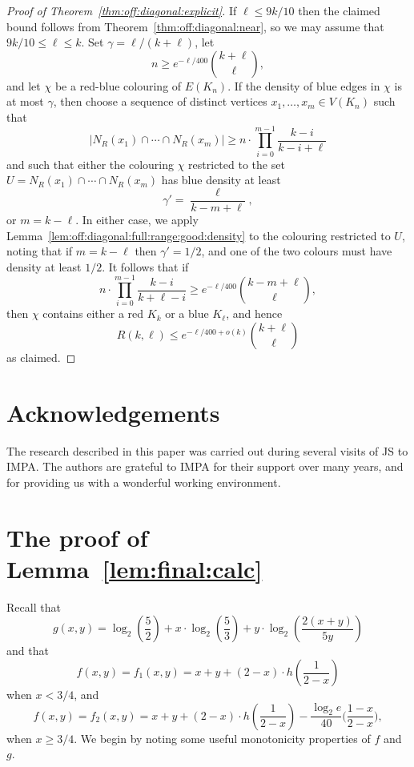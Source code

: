 \documentclass[12pt,reqno]{amsart}
\theoremstyle{definition}
\theoremstyle{remark}
\renewcommand{\le}{\leqslant}
\renewcommand{\ge}{\geqslant}
\begin{document}
\begin{proof}[Proof of Theorem~\ref{thm:off:diagonal:explicit}]
If $\ell \le 9k/10$ then the claimed bound follows from Theorem~\ref{thm:off:diagonal:near}, so we may assume that $9k/10 \le \ell \le k$. Set $\gamma = \ell/(k+\ell)$, let
$$n \ge e^{-\ell/400} {k + \ell \choose \ell},$$
and let $\chi$ be a red-blue colouring of $E(K_n)$. If the density of blue edges in $\chi$ is at most $\gamma$, then choose a sequence of distinct vertices $x_1,\ldots,x_m \in V(K_n)$ such that
\begin{equation}\label{eq:final:proof:steps}
|N_R(x_1) \cap \cdots \cap N_R(x_m)| \ge n \cdot \prod_{i = 0}^{m-1} \frac{k - i}{k - i + \ell}
\end{equation}
and such that either the colouring $\chi$ restricted to the set $U = N_R(x_1) \cap \cdots \cap N_R(x_m)$ has blue density at least 
$$\gamma' = \frac{\ell}{k - m + \ell},$$
or $m = k - \ell$. In either case, we apply Lemma~\ref{lem:off:diagonal:full:range:good:density} to the colouring restricted to $U$, noting that if $m = k - \ell$ then $\gamma' = 1/2$, and one of the two colours must have density at least $1/2$. It follows that if 
$$n \cdot \prod_{i = 0}^{m-1} \frac{k - i}{k + \ell - i} \ge e^{-\ell/400} {k - m + \ell \choose \ell},$$
then $\chi$ contains either a red $K_k$ or a blue $K_\ell$, and hence
$$R(k,\ell) \le e^{-\ell/400 + o(k)} {k + \ell \choose \ell}$$
as claimed. 
\end{proof}
   
\section*{Acknowledgements}

The research described in this paper was carried out during several visits of JS %
to IMPA. The authors are grateful to IMPA for their support over many years, and for providing us with a wonderful working environment.
 
 \medskip
 
 \pagebreak

\appendix
  
\section{The proof of Lemma~\ref{lem:final:calc}}\label{app:final:calc}
 
Recall that
$$g(x,y) = \log_2 \left( \frac{5}{2} \right) + x \cdot \log_2 \left(\frac{5}{3} \right) + y \cdot \log_2 \left(\frac{2(x+y)}{5y}\right)$$
and that  
$$f(x,y) = f_1(x,y) = x + y + (2 - x) \cdot h\left(\frac{1}{2-x}\right)$$ 
when $x < 3/4$, and 
$$f(x,y) = f_2(x,y) = x + y + (2 - x) \cdot h\left(\frac{1}{2-x}\right) - \frac{\log_2 e}{40} \bigg( \frac{1-x}{2-x} \bigg),$$
when $x \ge 3/4$. We begin by noting some useful monotonicity properties of $f$ and $g$.
\end{document}
